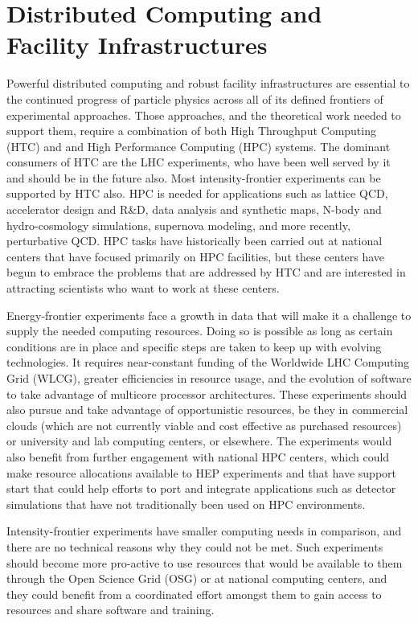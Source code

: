 \section{Distributed Computing and Facility Infrastructures}

Powerful distributed computing and robust facility infrastructures are essential to the continued progress of particle physics across all of its defined frontiers of experimental approaches.  Those approaches, and the theoretical work needed to support them, require a combination of both High Throughput Computing (HTC) and and High Performance Computing (HPC) systems.  The dominant consumers of HTC are the LHC experiments, who have been well served by it and should be in the future also.  Most intensity-frontier experiments can be supported by HTC also.  HPC is needed for applications such as lattice QCD, accelerator design and R\&D, data analysis and synthetic maps, N-body and hydro-cosmology simulations, supernova modeling, and more recently, perturbative QCD.  HPC tasks have historically been carried out at national centers that have focused primarily on HPC facilities, but these centers have begun to embrace the problems that are addressed by HTC and are interested in attracting scientists who want to work at these centers.

Energy-frontier experiments face a growth in data that will make it a challenge to supply the needed computing resources.  Doing so is possible as long as certain conditions are in place and specific steps are taken to keep up with evolving technologies.  It requires near-constant funding of the Worldwide LHC Computing Grid (WLCG), greater efficiencies in resource usage, and the evolution of software to take advantage of multicore processor architectures.  These experiments should also pursue and take advantage of opportunistic resources, be they in commercial clouds (which are not currently viable and cost effective as purchased resources) or university and lab computing centers, or elsewhere.  The experiments would also benefit from further engagement with national HPC centers, which could make resource allocations available to HEP experiments and that have support start that could help efforts to port and integrate applications such as detector simulations that have not traditionally been used on HPC environments.

Intensity-frontier experiments have smaller computing needs in comparison, and there are no technical reasons why they could not be met.  Such experiments should become more pro-active to use resources that would be available to them through the Open Science Grid (OSG) or at national computing centers, and they could benefit from a coordinated effort amongst them to gain access to resources and share software and training.

